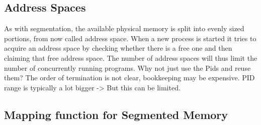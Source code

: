 \subsection{Address Spaces}
As with segmentation, the available physical memory is split into evenly sized portions, from now called address space.
When a new process is started it tries to acquire an address space by checking whether
there is a free one and then claiming that free address space.
The number of address spaces will thus limit the number of concurrently running programs.
Why not just use the Pids and reuse them? The order of termination is not clear, bookkeeping
may be expensive. PID range is typically a lot bigger -> But this can be limited.


\subsection{Mapping function for Segmented Memory}






